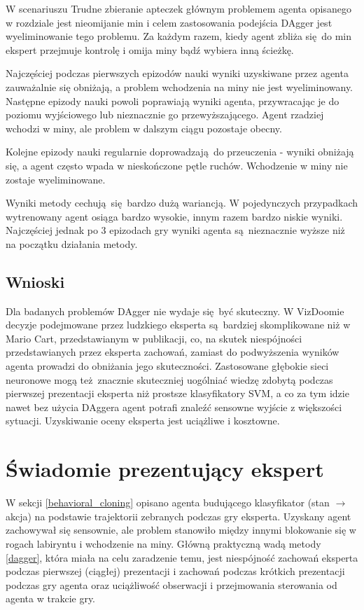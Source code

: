 \documentclass[polish,master,a4paper,oneside]{ppfcmthesis}
\begin{document}
W scenariuszu Trudne zbieranie apteczek głównym problemem agenta opisanego w rozdziale  jest nieomijanie min i celem zastosowania podejścia DAgger jest wyeliminowanie tego problemu. Za każdym razem, kiedy agent zbliża się do min ekspert przejmuje kontrolę i omija miny bądź wybiera inną ścieżkę.

Najczęściej podczas pierwszych epizodów nauki wyniki uzyskiwane przez agenta zauważalnie się obniżają, a problem wchodzenia na miny nie jest wyeliminowany. Następne epizody nauki powoli poprawiają wyniki agenta, przywracając je do poziomu wyjściowego lub nieznacznie go przewyższającego. Agent rzadziej wchodzi w miny, ale problem w dalszym ciągu pozostaje obecny. 

Kolejne epizody nauki regularnie doprowadzają do przeuczenia - wyniki obniżają się, a agent często wpada w nieskończone pętle ruchów. Wchodzenie w miny nie zostaje wyeliminowane.

Wyniki metody cechują się bardzo dużą wariancją. W pojedynczych przypadkach wytrenowany agent osiąga bardzo wysokie, innym razem bardzo niskie wyniki. Najczęściej jednak po 3 epizodach gry wyniki agenta są nieznacznie wyższe niż na początku działania metody.

\subsection{Wnioski}
Dla badanych problemów DAgger nie wydaje się być skuteczny. W VizDoomie decyzje podejmowane przez ludzkiego eksperta są bardziej skomplikowane niż w Mario Cart, przedstawianym w publikacji, co, na skutek niespójności przedstawianych przez eksperta zachowań, zamiast do podwyższenia wyników agenta prowadzi do obniżania jego skuteczności. Zastosowane głębokie sieci neuronowe mogą też znacznie skuteczniej uogólniać wiedzę zdobytą podczas pierwszej prezentacji eksperta niż prostsze klasyfikatory SVM, a co za tym idzie nawet bez użycia DAggera agent potrafi znaleźć sensowne wyjście z większości sytuacji. Uzyskiwanie oceny eksperta jest uciążliwe i kosztowne.

 \section{Świadomie prezentujący ekspert}\label{presenting_expert}
W sekcji \ref{behavioral_cloning} opisano agenta budującego klasyfikator (stan $\to$ akcja) na podstawie trajektorii zebranych podczas gry eksperta. Uzyskany agent zachowywał się sensownie, ale problem stanowiło między innymi blokowanie się w rogach labiryntu i wchodzenie na miny. Główną praktyczną wadą metody \ref{dagger}, która miała na celu zaradzenie temu, jest niespójność zachowań eksperta podczas pierwszej (ciągłej) prezentacji i zachowań podczas krótkich prezentacji podczas gry agenta oraz uciążliwość obserwacji i przejmowania sterowania od agenta w trakcie gry.
\end{document}
